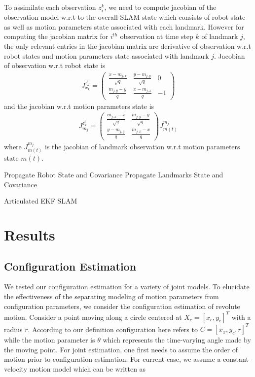 \documentclass[conference]{IEEEtran}
\begin{document}
To assimilate each observation $z_i^k$, we need to compute jacobian of the observation model w.r.t to the overall SLAM state which consists of robot state as well as motion parameters state associated with each landmark. However for computing the jacobian matrix for $i^{th}$ observation at time step $k$ of landmark $j$, the only relevant entries in the jacobian matrix are derivative of observation w.r.t robot states and motion parameters state associated with landmark $j$. Jacobian of observation w.r.t robot state is 
\begin{align}
J^{z^i_k}_{x_k} = 
\begin{pmatrix}
\frac{x-m_{j,x}}{\sqrt{q}} & \frac{y-m_{j,y}}{\sqrt{q}} & 0 \\
\frac{m_{j,y}-y}{q} & \frac{x-m_{j,x}}{q} & -1 
\end{pmatrix}
\end{align}
and the jacobian w.r.t motion parameters state is 
\begin{align}
J^{z^i_k}_{m_j} = 
\begin{pmatrix}
\frac{m_{j,x}-x}{\sqrt{q}} & \frac{m_{j,y}-y}{\sqrt{q}} \\
\frac{y-m_{j,y}}{q} & \frac{m_{j,x}-x}{q} 
\end{pmatrix}J^{m_j}_{m(t)}
\end{align}
where $J^{m_j}_{m(t)}$ is the jacobian of landmark observation w.r.t motion parameters state $m(t)$.

\begin{algorithm}
Propagate Robot State and Covariance\;
Propagate Landmarks State and Covariance\;
\caption{Articulated EKF SLAM}
\end{algorithm}


\section{Results}
\subsection{Configuration Estimation}\label{sec:configuration_estimation} We tested our configuration estimation for a variety of joint models. To elucidate the effectiveness of the separating modeling of motion parameters from configuration parameters, we consider the configuration estimation of revolute motion. Consider a point moving along a circle centered at $X_c = [x_c,y_c]^T$ with a radius $r$. According to our definition configuration here refers to $C = [x_x,y_c,r]^T$ while the motion parameter is $\theta$ which represents the time-varying angle made by the moving point. For joint estimation, one first needs to assume the order of motion prior to configuration estimation. For current case, we assume a constant-velocity motion model which can be written as
\end{document}

